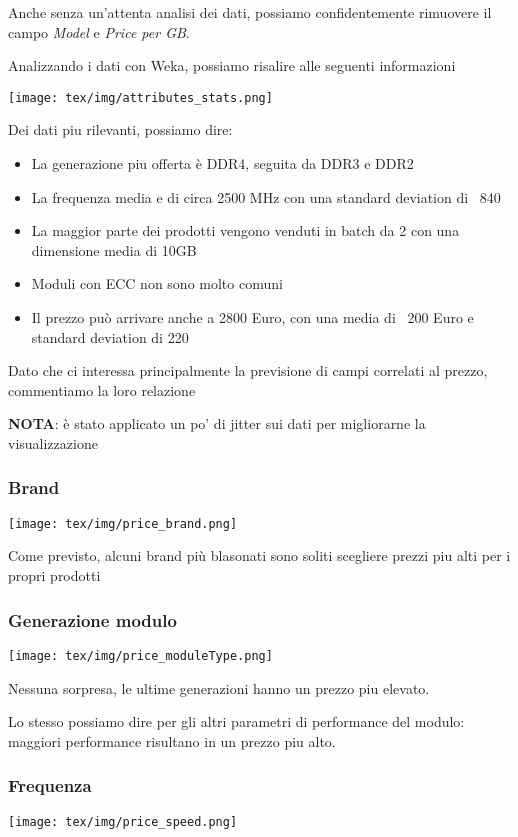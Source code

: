 \documentclass[12pt]{report}
\begin{document}
Anche senza un'attenta analisi dei dati, possiamo confidentemente rimuovere il campo \textit{Model} e \textit{Price per GB}.

\newpage
Analizzando i dati con Weka, possiamo risalire alle seguenti informazioni

\texttt{[image: tex/img/attributes\_stats.png]}

Dei dati piu rilevanti, possiamo dire:
\begin{itemize}
	\item La generazione piu offerta è DDR4, seguita da DDR3 e DDR2
	\item La frequenza media e di circa 2500 MHz con una standard deviation di ~840
	\item La maggior parte dei prodotti vengono venduti in batch da 2 con una dimensione media di 10GB
	\item Moduli con ECC non sono molto comuni
	\item Il prezzo può arrivare anche a 2800 Euro, con una media di ~200 Euro e standard deviation di 220
\end{itemize}

\newpage
Dato che ci interessa principalmente la previsione di campi correlati al prezzo,
commentiamo la loro relazione

\textbf{NOTA}: è stato applicato un po' di jitter sui dati per migliorarne la visualizzazione

\subsubsection{Brand}
\texttt{[image: tex/img/price\_brand.png]}

Come previsto, alcuni brand più blasonati sono soliti scegliere prezzi piu alti per i propri prodotti

\subsubsection{Generazione modulo}
\texttt{[image: tex/img/price\_moduleType.png]}

Nessuna sorpresa, le ultime generazioni hanno un prezzo piu elevato.

Lo stesso possiamo dire per gli altri parametri di performance del modulo: 
maggiori performance risultano in un prezzo piu alto.

\subsubsection{Frequenza}
\texttt{[image: tex/img/price\_speed.png]}
\end{document}

